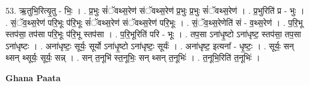 \documentclass[17pt]{extarticle}
\begin{document}
53. ऋ॒तुभि॒रित्यृ॒तु - भिः॒ । . प्र॒भुः सं॑ॅवथ्स॒रेण॑ संॅवथ्स॒रेण॑ प्र॒भुः प्र॒भुः सं॑ॅवथ्स॒रेण॑ । . प्र॒भुरिति॑ प्र - भुः । . सं॒ॅव॒थ्स॒रेण॑ परि॒भूः प॑रि॒भूः सं॑ॅवथ्स॒रेण॑ संॅवथ्स॒रेण॑ परि॒भूः । . सं॒ॅव॒थ्स॒रेणेति॑ सं - व॒थ्स॒रेण॑ । . प॒रि॒भू स्तप॑सा॒ तप॑सा परि॒भूः प॑रि॒भू स्तप॑सा । . प॒रि॒भूरिति॑ परि - भूः । . तप॒सा ऽना॑धृ॒ष्टो ऽना॑धृष्ट॒ स्तप॑सा॒ तप॒सा ऽना॑धृष्टः । . अना॑धृष्टः॒ सूर्यः॒ सूर्यो ऽना॑धृ॒ष्टो ऽना॑धृष्टः॒ सूर्यः॑ । . अना॑धृष्ट॒ इत्यना᳚ - धृ॒ष्टः॒ । . सूर्यः॒ सन् थ्सन् थ्सूर्यः॒ सूर्यः॒ सन्न् । . सन् त॒नूभि॑ स्त॒नूभिः॒ सन् थ्सन् त॒नूभिः॑ । . त॒नूभि॒रिति॑ त॒नूभिः॑ । \newline

\textbf{Ghana Paata } \newline
\end{document}
